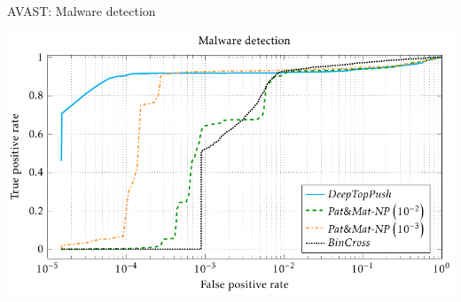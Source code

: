 \documentclass[10pt, aspectratio=169]{beamer}
\begin{document}

\begin{frame}{AVAST: Malware detection}
  \begin{center}
    \includegraphics[width=\linewidth, height=0.9\textheight, keepaspectratio]{
      ../images/malware_detection.pdf
    }
  \end{center}
\end{frame}
\end{document}
